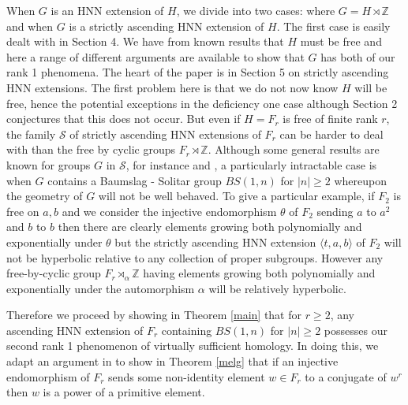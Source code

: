 \documentclass[11pt,reqno]{amsart}
\numberwithin{equation}{section}
\newcommand{\Z}{\mathbb{Z}}
\newcommand{\geqs}{\geqslant}
\theoremstyle{definition}
\theoremstyle{remark}
\begin{document}
When $G$ is an HNN extension of $H$,
we divide into two cases: where $G=H\rtimes\Z$ and when $G$ is a strictly
ascending HNN extension of $H$. The first case is easily dealt with in
Section 4. We have from known results that $H$ must be free and here
a range of different arguments are available to show that $G$ has both
of our rank 1 phenomena. The heart of the paper is in Section 5 on
strictly ascending HNN extensions. The first problem here is that we
do not now know $H$ will be free, hence the potential
exceptions in the deficiency one case although \cite{bi} Section 2
conjectures that this does not occur. But even if $H=F_r$ is free
of finite rank $r$, the family $\mathcal S$ of
strictly ascending HNN extensions of $F_r$
can be harder to deal with than the free by cyclic groups $F_r\rtimes\Z$.
Although some general results are known for groups $G$ in
$\mathcal S$, for instance
\cite{bs} and \cite{mut}, a particularly intractable case is when 
$G$ contains a Baumslag - Solitar group $BS(1,n)$ for $|n|\geq 2$ whereupon
the geometry of $G$ will not be well behaved. To give a particular
example, if $F_2$ is free on $a,b$ and we consider the injective endomorphism
$\theta$ of $F_2$ sending $a$ to $a^2$ and $b$ to $b$ then there are clearly
elements growing both polynomially and exponentially under $\theta$ but
the strictly ascending HNN extension $\langle t,a,b\rangle$ of $F_2$ will
not be hyperbolic relative to any collection of proper subgroups. However
any free-by-cyclic group $F_r\rtimes_\alpha\Z$ having elements growing both
polynomially and exponentially under the automorphism $\alpha$ will be
relatively hyperbolic.

Therefore we proceed by showing in Theorem \ref{main} that for $r\geq 2$,
any ascending HNN extension of $F_r$ containing $BS(1,n)$ for $|n|\geqs 2$
possesses our second rank 1 phenomenon of virtually sufficient homology.
In doing this, we adapt an argument in \cite{lgv3} to show in Theorem
\ref{melg} that if an injective endomorphism of $F_r$ sends some
non-identity element $w\in F_r$ to a conjugate of $w^r$ then $w$ is a
power of a primitive element.
\end{document}
